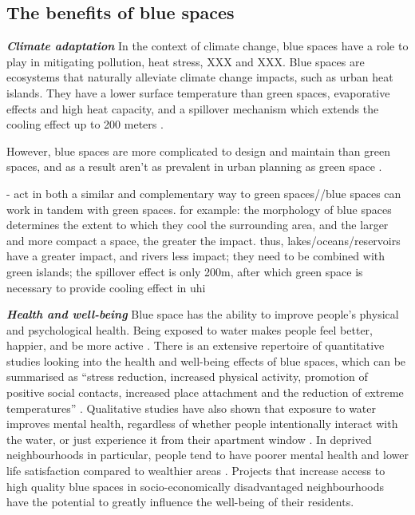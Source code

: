 \documentclass{article}
\newcommand{\bisection}[1]{\textbf{\textit{#1}}}
\begin{document}

\subsection{The benefits of blue spaces}

\bisection{Climate adaptation}
In the context of climate change, blue spaces have a role to play in mitigating pollution, heat stress, XXX and XXX. 
Blue spaces are ecosystems that naturally alleviate climate change impacts, such as urban heat islands. They have a lower surface temperature than green spaces, evaporative effects and high heat capacity, and a spillover mechanism which extends the cooling effect up to 200 meters \parencite{lin2020water}.

However, blue spaces are more complicated to design and maintain than green spaces, and as a result aren't as prevalent in urban planning as green space \parencite{TODO:find ref in lin2020water}. 

- act in both a similar and complementary way to green spaces//blue spaces can work in tandem with green spaces. for example: the morphology of blue spaces determines the extent to which they cool the surrounding area, and the larger and more compact a space, the greater the impact. thus, lakes/oceans/reservoirs have a greater impact, and rivers less impact; they need to be combined with green islands; the spillover effect is only 200m, after which green space is necessary to provide cooling effect in uhi 	\parencite{lin2020water}

\bisection{Health and well-being}
Blue space has the ability to improve people's physical and psychological health. Being exposed to water makes people feel better, happier, and be more active \parencite{gascon2017outdoor}. 
There is an extensive repertoire of quantitative studies looking into the health and well-being effects of blue spaces, which can be summarised as ``stress reduction, increased physical activity, promotion of positive social contacts, increased place attachment and the reduction of extreme temperatures'' \parencite{gascon2017outdoor}. Qualitative studies have also shown that exposure to water improves mental health, regardless of whether people intentionally interact with the water, or just experience it from their apartment window \parencite{garrett2019urban}.
In deprived neighbourhoods in particular, people tend to have poorer mental health and lower life satisfaction compared to wealthier areas \parencite{van2021urban}. Projects that increase access to high quality blue spaces in socio-economically disadvantaged neighbourhoods have the potential to greatly influence the well-being of their residents.
\end{document}
